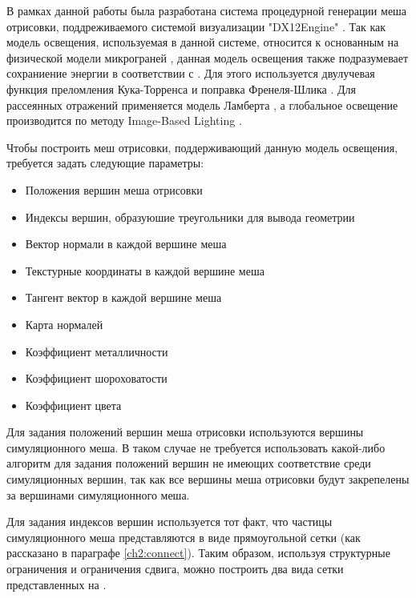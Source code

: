 	В рамках данной работы была разработана система процедурной генерации меша отрисовки, поддреживаемого системой визуализации "DX12Engine" \cite{me_bachelor}. Так как модель освещения, используемая в данной системе, относится к основанным на физической модели микрограней \cite{walter2007microfacet}, данная модель освещения также подразумевает сохраниение энергии в соответствии с  \cite{kajiya1986rendering}. Для этого используется двулучевая функция преломления Кука-Торренса \cite{cook1982reflectance} и поправка Френеля-Шлика \cite{schlick1994inexpensive}. Для рассеянных отражений применяется модель Ламберта \cite{ikeuchi2014lambertian}, а глобальное освещение производится по методу Image-Based Lighting \cite{debevec1998rendering}.
	
	Чтобы построить меш отрисовки, поддерживающий данную модель освещения, требуется задать следующие параметры:
	\begin{itemize}
		\item Положения вершин меша отрисовки
		\item Индексы вершин, образуюшие треугольники для вывода геометрии
		\item Вектор нормали в каждой вершине меша
		\item Текстурные координаты в каждой вершине меша
		\item Тангент вектор в каждой вершине меша
		\item Карта нормалей
		\item Коэффициент металличности
		\item Коэффициент шороховатости
		\item Коэффициент цвета
	\end{itemize}
	
	Для задания положений вершин меша отрисовки используются вершины симуляционного меша. В таком случае не требуется использовать какой-либо алгоритм для задания положений вершин не имеющих соответствие среди симуляционных вершин, так как все вершины меша отрисовки будут закрепелены за вершинами симуляционного меша.
	
	Для задания индексов вершин используется тот факт, что частицы симуляционного меша представляются в виде прямоугольной сетки (как рассказано в параграфе \ref{ch2:connect}). Таким образом, используя структурные ограничения и ограничения сдвига, можно построить два вида сетки представленных на .
	
